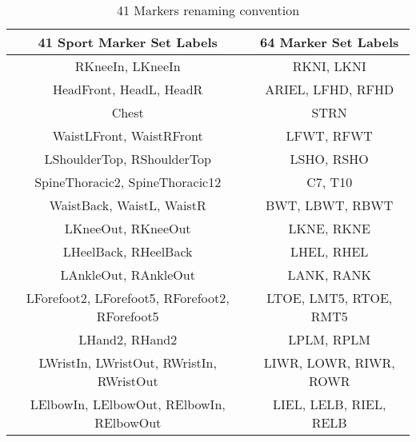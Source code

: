 \begin{table}[H]
    \centering
    \begin{tabular}{||c||c||}
    \hline
    \textbf{41 Sport Marker Set Labels} & \textbf{64 Marker Set Labels} \\
    \hline
    RKneeIn, LKneeIn & RKNI, LKNI \\
    HeadFront, HeadL, HeadR & ARIEL, LFHD, RFHD \\
    Chest & STRN \\
    WaistLFront, WaistRFront & LFWT, RFWT \\
    LShoulderTop, RShoulderTop & LSHO, RSHO \\
    SpineThoracic2, SpineThoracic12 & C7, T10 \\
    WaistBack, WaistL, WaistR & BWT, LBWT, RBWT \\
    LKneeOut, RKneeOut & LKNE, RKNE \\
    LHeelBack, RHeelBack & LHEL, RHEL \\
    LAnkleOut, RAnkleOut & LANK, RANK \\
    LForefoot2, LForefoot5, RForefoot2, RForefoot5& LTOE, LMT5, RTOE, RMT5\\
    LHand2, RHand2 & LPLM, RPLM \\
    LWristIn, LWristOut, RWristIn, RWristOut & LIWR, LOWR, RIWR, ROWR \\
    LElbowIn, LElbowOut, RElbowIn, RElbowOut & LIEL, LELB, RIEL, RELB \\
    \hline
    \end{tabular}
    \caption{41 Markers renaming convention}
    \label{tab:marker_mapping_41}
\end{table}

